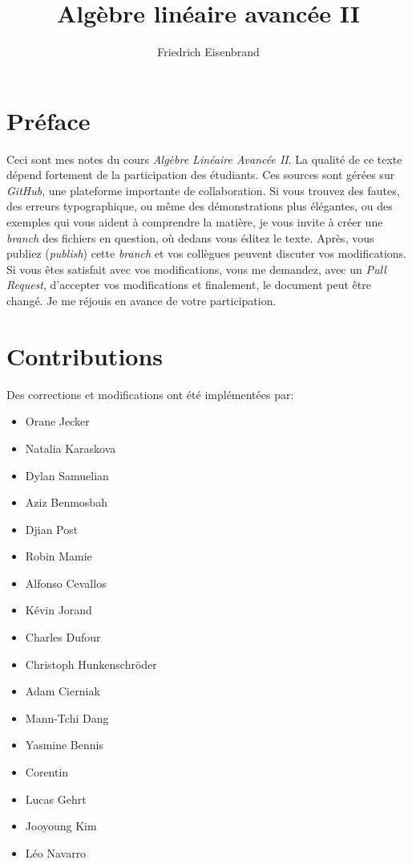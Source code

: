 \documentclass[a4paper,11pt,french]{scrbook}
\title{Algèbre linéaire avancée II}
\author{Friedrich Eisenbrand}
\theoremstyle{plain}
\theoremstyle{definition}
\begin{document}
\maketitle
  
\section*{Préface}
\noindent Ceci sont mes notes du cours \emph{Algèbre Linéaire Avancée II}.
La qualité de ce texte dépend fortement de la participation  des étudiants. 
Ces  sources sont gérées sur \emph{GitHub}, une plateforme importante de collaboration. Si vous trouvez des fautes, des erreurs typographique, ou même des démonstrations plus élégantes, ou des exemples qui vous aident à comprendre la matière, je vous invite à créer une \emph{branch} des fichiers en question, où dedans vous éditez le texte. Après, vous publiez (\emph{publish}) cette \emph{branch} et vos collègues peuvent discuter vos modifications. Si vous êtes satisfait avec vos modifications, vous me demandez, avec un \emph{Pull Request}, d'accepter vos modifications et finalement, le document peut être changé. Je me réjouis en avance de votre participation. 

  
\section*{Contributions}

Des corrections et modifications ont été implémentées par: 
\begin{itemize}
\item Orane Jecker 
\item Natalia Karaskova
\item Dylan Samuelian
\item Aziz Benmosbah
\item Djian Post
\item Robin Mamie
\item Alfonso Cevallos
\item Kévin Jorand
\item Charles Dufour 
\item Christoph Hunkenschröder
\item Adam Cierniak
\item Mann-Tchi Dang
\item Yasmine Bennis
\item Corentin 
\item Lucas Gehrt
\item Jooyoung Kim 
\item Léo Navarro
\end{itemize}

\tableofcontents








\end{document}

